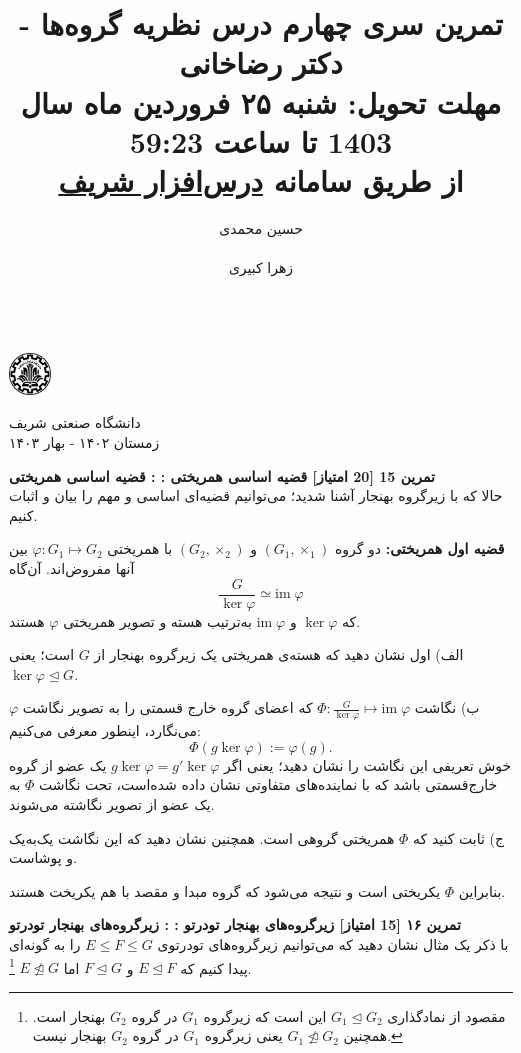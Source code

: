 \documentclass{article}
\title{
	\vspace{-0.8em}
تمرین سری چهارم درس نظریه گروه‌ها - دکتر رضاخانی
\\
{\normalsize
\textbf{مهلت تحویل:
شنبه ۲۵ فروردین ماه سال 1403 تا ساعت 59:23
\\
\vspace{-0.4em}
از طریق سامانه
\href{https://cw.sharif.edu/}{درس‌افزار شریف}
}
}
\vspace{-0.6em}
}
\author{
حسین محمدی\\
  \lr{
  		\href{mailto:hossein.mohammadi.00427@gmail.com}{\texttt{	hossein.mohammadi.00427@gmail.com}}} \\
  \And
  زهرا کبیری\\
 \lr{
  		\href{mailto:kabiri.zahra98@gmail.com}{ \texttt{kabiri.zahra98@gmail.com}}}\\
  }
\newenvironment{exercise}[3][\unskip]{%
	\par
	\noindent
	\textbf{تمرین
		#1
		[#2 امتیاز] 
		\def\temp{#3}\ifx\temp\empty
		: 
		\else
		: #3 \vspace{0.5em} \\ \noindent
		\fi
}}{}
\begin{document}
\begin{minipage}{0.1\textwidth}%
\includegraphics[width=1.1cm]{sharif-logo.png}
\end{minipage}%
\hfill%
\begin{minipage}{0.9\textwidth}\raggedleft
دانشگاه صنعتی شریف\\
زمستان ۱۴۰۲ - بهار ۱۴۰۳\\
\end{minipage}

\makepertitle


\begin{exercise}[15]{20}{قضیه اساسی همریختی}
حالا که با زیرگروه بهنجار آشنا شدید؛ می‌توانیم قضیه‌ای اساسی و مهم را بیان و اثبات کنیم.	

\noindent
\textbf{قضیه اول همریختی:}
دو گروه 
$(G_1,\times_1)$
و
$(G_2,\times_2)$
با همریختی
$\varphi: G_1 \longmapsto G_2$
 بین آنها مفروض‌اند. آن‌گاه
\[
\frac{G}{\ker \varphi} \simeq \text{im} \; \varphi
\]
	که $\ker \varphi$ و $ \text{im} \; \varphi$ به‌ترتیب هسته و تصویر همریختی 
	$\varphi$
	هستند.
	
	\noindent
	الف) اول نشان دهید که هسته‌ی همریختی یک زیرگروه بهنجار از 
	$G$
	است؛ یعنی 
	$\ker \varphi \trianglelefteq G$.
	
	\noindent
	ب) نگاشت 
	$\Phi:\frac{G}{\ker \varphi} \longmapsto \text{im} \; \varphi$
	 که اعضای گروه خارج قسمتی را به تصویر نگاشت 
	$\varphi$
	می‌نگارد، اینطور معرفی می‌کنیم:
	\[
	\Phi (g \ker\varphi) := \varphi(g).
	\]
خوش تعریفی این نگاشت را نشان دهید؛ یعنی اگر 
$g\ker\varphi = g'\ker\varphi$
یک عضو از گروه خارج‌قسمتی باشد که با نماینده‌های متفاوتی نشان داده شده‌است، تحت نگاشت 
$\Phi$
به یک عضو از تصویر نگاشته می‌شوند.

\noindent
ج) ثابت کنید که 
$\Phi$
 همریختی گروهی است. همچنین نشان دهید که این نگاشت یک‌به‌یک و پوشاست.


\noindent
بنابراین $\Phi$ یکریختی است و نتیجه می‌شود که گروه مبدا و مقصد با هم یکریخت هستند.
\end{exercise}



\begin{exercise}[۱۶]{15}{زیرگروه‌های بهنجار تو‌درتو
	\LTRfootnote{Nested normal subgroups}
	}
با ذکر یک مثال نشان دهید که می‌توانیم  زیرگروه‌های تودرتوی $E\leq F \leq G $  را به گونه‌ای پیدا کنیم که 
$E \trianglelefteq F$
و
 $F \trianglelefteq G$
 اما  
 $E \ntrianglelefteq G$
 \footnote{مقصود از نمادگذاری
 $G_1 \trianglelefteq G_2$
 این است که زیرگروه $G_1$ در گروه $G_2$ بهنجار است. همچنین
  $G_1 \ntrianglelefteq G_2$
  یعنی زیرگروه $G_1$ در گروه $G_2$ بهنجار نیست.
 }.
\end{exercise}
\end{document}
